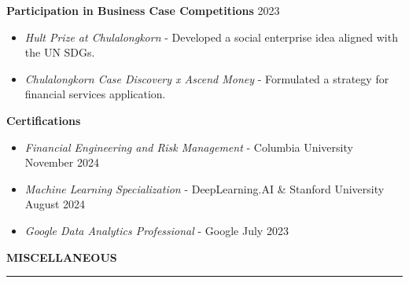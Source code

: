\documentclass[a4paper, 11pt]{article}
\begin{document}
\vspace{3pt}

\textbf{Participation in Business Case Competitions} \hfill 2023
\begin{itemize}[noitemsep, topsep=0pt, partopsep=0pt, parsep=0pt]
    \item \textit{Hult Prize at Chulalongkorn} - Developed a social enterprise idea aligned with the UN SDGs.
    \item \textit{Chulalongkorn Case Discovery x Ascend Money} - Formulated a strategy for financial services application.
\end{itemize}

\vspace{3pt}

\textbf{Certifications}
\begin{itemize}[noitemsep, topsep=0pt, partopsep=0pt, parsep=0pt]
    \item \textit{Financial Engineering and Risk Management} - Columbia University \hfill November 2024
    \item \textit{Machine Learning Specialization} - DeepLearning.AI \& Stanford University \hfill August 2024
    \item \textit{Google Data Analytics Professional} - Google \hfill July 2023
\end{itemize}





\vspace{6pt}
\textbf{MISCELLANEOUS}
\vspace{5pt}
{\color{NavyBlue}\hrule}
\vspace{6pt}
\end{document}
